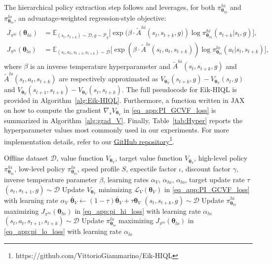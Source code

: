 \documentclass{article}
\theoremstyle{plain}
\theoremstyle{definition}
\theoremstyle{remark}
\begin{document}
The hierarchical policy extraction step follows \citet{park2024hiql} and leverages, for both $\pi^{hi}_{\bm{\theta}_{hi}}$ and $\pi^{lo}_{\bm{\theta}_{lo}}$, an advantage-weighted regression-style objective:
\begin{align}
    J_{\pi^{hi}}(\bm{\theta}_{hi}) &= \mathbb{E}_{(s_t,s_{t+k}) \sim \mathcal{D}, g \sim \mathcal{P}_g}\Big[\exp(\beta \cdot \tilde A^{hi}\left(s_t, s_{t+k}, g)\right)\log \pi^{hi}_{\bm{\theta}_{hi}}(s_{t+k}|s_t, g) \Big], \label{eq_app:pi_hi_loss}\\
    J_{\pi^{lo}}(\bm{\theta}_{lo}) &= \mathbb{E}_{(s_t, a_t, s_{t+1}, s_{t+k}) \sim \mathcal{D}}\Big[\exp(\beta \cdot \tilde A^{lo}(s_t, a_t, s_{t+k}))\log \pi_{\bm{\theta}_{lo}}^{lo}(a_t|s_t, s_{t+k}) \Big], \label{eq_app:pi_lo_loss}
\end{align}
where $\beta$ is an inverse temperature hyperparameter and $\tilde A^{hi}\left(s_t, s_{t+k}, g\right)$ and $\tilde A^{lo}(s_t, a_t, s_{t+k})$ are respectively approximated as $V_{\bm{\theta}_V}(s_{t+k}, g) - V_{\bm{\theta}_V}(s_{t}, g)$ and $V_{\bm{\theta}_V}(s_{t+1}, s_{t+k}) - V_{\bm{\theta}_V}(s_{t}, s_{t+k})$.
The full pseudocode for Eik-HIQL is provided in Algorithm~\ref{alg:Eik-HIQL}. Furthermore, a function written in JAX on how to compute the gradient $\nabla_s V_{\bm{\theta}_V}$ in \eqref{eq_app:PI_GCVF_loss} is summarized in Algorithm~\ref{alg:grad_V}. Finally, Table~\ref{tab:Hyper} reports the hyperparameter values most commonly used in our experiments. For more implementation details, refer to our \href{https://github.com/VittorioGiammarino/Eik-HIQL}{GitHub repository}\footnote{https://github.com/VittorioGiammarino/Eik-HIQL}.

\begin{algorithm}
   \caption{Eikonal-regularized Hierarchical Implicit Q-Learning (Eik-HIQL)}
   \label{alg:Eik-HIQL}
\begin{algorithmic}
    Offline dataset $\mathcal{D}$, value function $V_{\bm{\theta}_V}$, target value function $V_{\bar{\bm{\theta}}_V}$, high-level policy $\pi^{hi}_{\bm{\theta}_{hi}}$, low-level policy $\pi^{lo}_{\bm{\theta}_{lo}}$, speed profile $S$, expectile factor $\iota$, discount factor $\gamma$, inverse temperature parameter $\beta$, learning rates $\alpha_V$, $\alpha_{hi}$, $\alpha_{lo}$, target update rate $\tau$
   \STATE $(s_t, s_{t+1}, g) \sim \mathcal{D}$ 
   \STATE Update $V_{\bm{\theta}_V}$ minimizing $\mathcal{L}_V(\bm{\theta}_V)$ in \eqref{eq_app:PI_GCVF_loss} with learning rate $\alpha_V$
   \STATE $\bar{\bm{\theta}}_V \gets (1-\tau)\bar{\bm{\theta}}_V + \tau \bm{\theta}_V$
   \ENDWHILE
   \STATE $(s_t, s_{t+k}, g) \sim \mathcal{D}$ 
   \STATE Update $\pi^{hi}_{\bm{\theta}_{hi}}$ maximizing $J_{\pi^{hi}}(\bm{\theta}_{hi})$ in \eqref{eq_app:pi_hi_loss} with learning rate $\alpha_{hi}$
   \ENDWHILE
   \STATE $(s_t, a_t, s_{t+1}, s_{t+k}) \sim \mathcal{D}$ 
   \STATE Update $\pi^{lo}_{\bm{\theta}_{lo}}$ maximizing $J_{\pi^{lo}}(\bm{\theta}_{lo})$ in \eqref{eq_app:pi_lo_loss} with learning rate $\alpha_{lo}$
   \ENDWHILE
\end{algorithmic}
\end{algorithm}
\end{document}
